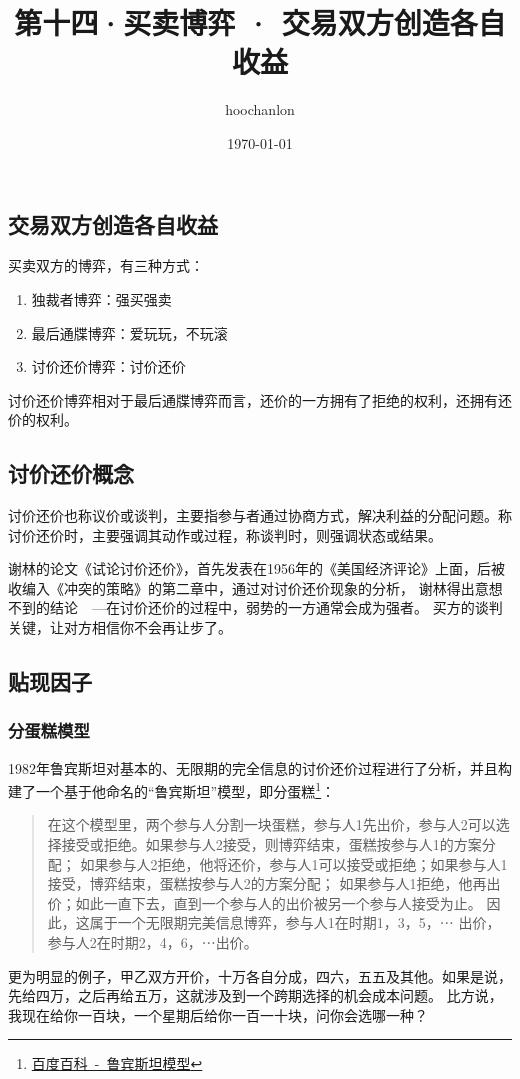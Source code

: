 \documentclass[12pt, a4paper]{article}
\title{第十四·买卖博弈 · 交易双方创造各自收益}
\author{hoochanlon}
\date{\today}
\begin{document}
	\begin{CJK*}{UTF8}{gbsn}
		\maketitle

        \clearpage
        \section{交易双方创造各自收益}
        \begin{flushleft}
        买卖双方的博弈，有三种方式：
        \begin{enumerate}
            \item 独裁者博弈：强买强卖
            \item 最后通牒博弈：爱玩玩，不玩滚
            \item 讨价还价博弈：讨价还价
        \end{enumerate}
        讨价还价博弈相对于最后通牒博弈而言，还价的一方拥有了拒绝的权利，还拥有还价的权利。
        \subsection{讨价还价概念}
        讨价还价也称议价或谈判，主要指参与者通过协商方式，解决利益的分配问题。称讨价还价时，主要强调其动作或过程，称谈判时，则强调状态或结果。\par

        谢林的论文《试论讨价还价》，首先发表在1956年的《美国经济评论》上面，后被收编入《冲突的策略》的第二章中，通过对讨价还价现象的分析，
        谢林得出意想不到的结论~~—在讨价还价的过程中，弱势的一方通常会成为强者。 买方的谈判关键，让对方相信你不会再让步了。\par

        \subsection{贴现因子}
        \subsubsection{分蛋糕模型}
        1982年鲁宾斯坦对基本的、无限期的完全信息的讨价还价过程进行了分析，并且构建了一个基于他命名的“鲁宾斯坦”模型，即分蛋糕\footnote{\href{http://www.baidu.com/}{百度百科~-~鲁宾斯坦模型}}：
        \begin{quote}
            {\small
            在这个模型里，两个参与人分割一块蛋糕，参与人1先出价，参与人2可以选择接受或拒绝。如果参与人2接受，则博弈结束，蛋糕按参与人1的方案分配；
            如果参与人2拒绝，他将还价，参与人1可以接受或拒绝；如果参与人1接受，博弈结束，蛋糕按参与人2的方案分配；
            如果参与人1拒绝，他再出价；如此一直下去，直到一个参与人的出价被另一个参与人接受为止。
            因此，这属于一个无限期完美信息博弈，参与人1在时期1，3，5，⋯ 出价，参与人2在时期2，4，6，⋯出价。}
        \end{quote}
        更为明显的例子，甲乙双方开价，十万各自分成，四六，五五及其他。如果是说，先给四万，之后再给五万，这就涉及到一个跨期选择的机会成本问题。
        比方说，我现在给你一百块，一个星期后给你一百一十块，问你会选哪一种？


\end{flushleft}
\end{CJK*}
\end{document}
